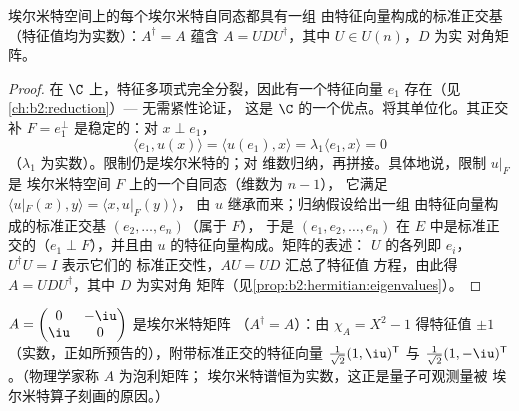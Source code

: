 \begin{theorem}[埃尔米特谱定理]\label{thm:b2:hermitian:spectral}
埃尔米特空间上的每个埃尔米特自同态都具有一组
由特征向量构成的标准正交基（特征值均为实数）：$A^\dagger = A$
蕴含 $A = U D U^{\dagger}$，其中 $U \in U(n)$，$D$ 为实
对角矩阵。
\end{theorem}

\begin{proof}
在 $\C$ 上，特征多项式完全分裂，因此有一个特征向量
$e_1$ 存在（见\cref{ch:b2:reduction}）--- 无需紧性论证，
这是 $\C$ 的一个优点。将其单位化。其正交补
$F = e_1^\perp$ 是稳定的：对 $x \perp e_1$，
\[
\langle e_1, u(x)\rangle = \langle u(e_1), x\rangle
= \lambda_1\langle e_1, x\rangle = 0
\]
（$\lambda_1$ 为实数）。限制仍是埃尔米特的；对
维数归纳，再拼接。具体地说，限制 $u|_F$ 是
埃尔米特空间 $F$ 上的一个自同态（维数为 $n - 1$），
它满足 $\langle u|_F(x), y\rangle = \langle x, u|_F(y)\rangle$，
由 $u$ 继承而来；归纳假设给出一组
由特征向量构成的标准正交基 $(e_2, \dots, e_n)$（属于 $F$），
于是 $(e_1, e_2, \dots, e_n)$ 在 $E$ 中是标准正交的（$e_1 \perp
F$），并且由 $u$ 的特征向量构成。矩阵的表述：
$U$ 的各列即 $e_i$，$U^\dagger U = I$ 表示它们的
标准正交性，$AU = UD$ 汇总了特征值
方程，由此得 $A = UDU^\dagger$，其中 $D$ 为实对角
矩阵（见\cref{prop:b2:hermitian:eigenvalues}）。
\end{proof}

\begin{example}\label{ex:b2:hermitian:pauli}
$A = \begin{pmatrix} 0 & -\iu\\ \iu & 0\end{pmatrix}$ 是埃尔米特矩阵
（$A^\dagger = A$）：由 $\chi_A = X^2 - 1$ 得特征值 $\pm 1$
（实数，正如所预告的），附带标准正交的特征向量
$\frac{1}{\sqrt2}(1, \iu)^{\mathsf T}$ 与 $\frac{1}{\sqrt2}(1,
-\iu)^{\mathsf T}$。（物理学家称 $A$ 为泡利矩阵；
埃尔米特谱恒为实数，这正是量子可观测量被
埃尔米特算子刻画的原因。）
\end{example}

